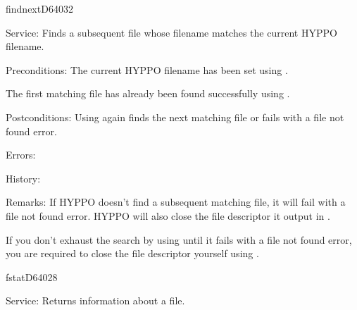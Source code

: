 %
\newpage
\begin{hyppotrap}{findnext}{D640}{32}
\item [Service:]
  Finds a subsequent file whose filename matches the current HYPPO filename.
\item [Preconditions:]
  The current HYPPO filename has been set using .

  The first matching file has already been found successfully using
  .
\item [Postconditions:]
  Using  again finds the next matching file or fails with a
  file not found error.
\item [Errors:]
\item [History:]
\item [Remarks:]
  If HYPPO doesn't find a subsequent matching file, it will fail with a
  file not found error. HYPPO will also close the file descriptor it
  output in .

  If you don't exhaust the search by using  until it fails
  with a file not found error, you are required to close the file descriptor
  yourself using .
\end{hyppotrap}


\newpage
\begin{hyppotrap}{fstat}{D640}{28}
\item [Service:]
  Returns information about a file.
\notimplemented
\end{hyppotrap}


